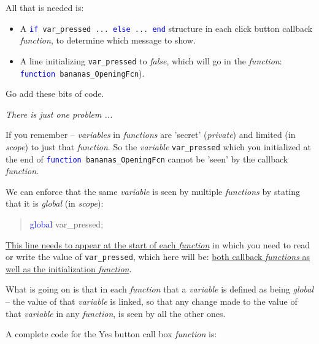 \documentclass{tufte-book} %
\newenvironment{docspec}{\begin{quotation}\ttfamily\parskip0pt\parindent0pt\ignorespaces}{\end{quotation}}
\begin{document}
All that is needed is:

\begin{itemize}[noitemsep]
\item A \texttt{\textcolor{blue}{if} var\_pressed ... \textcolor{blue}{else} ... \textcolor{blue}{end}} structure in each click button callback \textit{function}, to determine which message to show.
\item A line initializing \texttt{var\_pressed} to \textit{false}, which will go in the \textit{function}: \texttt{\textcolor{blue}{function} bananas\_OpeningFcn}).
\end{itemize}
Go add these bits of code.

\vspace{4mm}
\noindent \textit{There is just one problem ...}

\newpage

\noindent If you remember -- \textit{variables} in \textit{functions} are 'secret' (\textit{private}) and limited (in \textit{scope}) to just that \textit{function}. So the \textit{variable} \texttt{var\_pressed} which you initialized at the end of \texttt{\textcolor{blue}{function} bananas\_OpeningFcn} cannot be 'seen' by the callback \textit{function}.

We can enforce that the same \textit{variable} is seen by multiple \textit{functions} by stating that it is \textit{global} (in \textit{scope}):
\begin{docspec}
\textcolor{blue}{global} var\_pressed;
\end{docspec}
\uline{This line needs to appear at the start of each \textit{function}} in which you need to read or write the value of \texttt{var\_pressed}, which here will be: \uline{both callback \textit{functions} as well as the initialization \textit{function}}.

What is going on is that in each \textit{function} that a \textit{variable} is defined as being \textit{global} -- the value of that \textit{variable} is linked, so that any change made to the value of that \textit{variable} in any \textit{function}, is seen by all the other ones. 

A complete code for the \textsf{Yes} button call box \textit{function} is:
\end{document}
